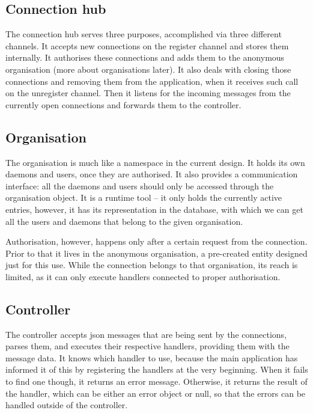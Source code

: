 \documentclass{l3proj}
\begin{document}
\subsection{Connection hub}

The connection hub serves three purposes, accomplished via three different channels. It accepts new connections on the register channel and stores them internally. It authorises these connections and adds them to the anonymous organisation (more about organisations later). It also deals with closing those connections and removing them from the application, when it receives such call on the unregister channel. Then it listens for the incoming messages from the currently open connections and forwards them to the controller. 

\subsection{Organisation}

The organisation is much like a namespace in the current design. It holds its own daemons and users, once they are authorised. It also provides a communication interface: all the daemons and users should only be accessed through the organisation object. It is a runtime tool – it only holds the currently active entries, however, it has its representation in the database, with which we can get all the users and daemons that belong to the given organisation. 

Authorisation, however, happens only after a certain request from the connection. Prior to that it lives in the anonymous organisation, a pre-created entity designed just for this use. While the connection belongs to that organisation, its reach is limited, as it can only execute handlers connected to proper authorisation.

\subsection{Controller}

The controller accepts json messages that are being sent by the connections, parses them, and executes their respective handlers, providing them with the message data. It knows which handler to use, because the main application has informed it of this by registering the handlers at the very beginning. When it fails to find one though, it returns an error message. Otherwise, it returns the result of the handler, which can be either an error object or null, so that the errors can be handled outside of the controller.
\end{document}
